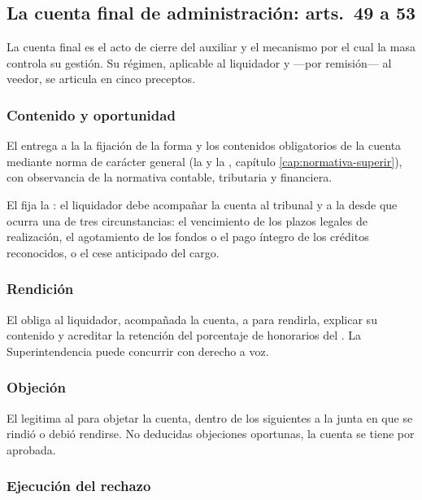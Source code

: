 \subsection{La cuenta final de administración: arts.\ 49 a 53}

La cuenta final es el acto de cierre del auxiliar y el mecanismo por el cual la masa controla su
gestión. Su régimen, aplicable al liquidador y ---por remisión--- al veedor, se articula en
cinco preceptos.

\subsubsection{Contenido y oportunidad}

El  entrega a la \superir{} la fijación de la forma y los contenidos obligatorios de la
cuenta mediante norma de carácter general (la  y la , capítulo
\ref{cap:normativa-superir}), con observancia de la normativa contable, tributaria y financiera.

El  fija la : el liquidador debe acompañar la cuenta al tribunal y
a la \superir{}  desde que ocurra una de tres circunstancias:
el vencimiento de los plazos legales de realización, el agotamiento de los fondos o el pago
íntegro de los créditos reconocidos, o el cese anticipado del cargo.

\subsubsection{Rendición}

El  obliga al liquidador, acompañada la cuenta, a 
para rendirla, explicar su contenido y acreditar la retención del porcentaje de honorarios del
 . La Superintendencia puede concurrir con derecho a voz.

\subsubsection{Objeción}

El  legitima al  para objetar
la cuenta, dentro de los  siguientes a la junta en que se rindió o debió
rendirse. No deducidas objeciones oportunas, la cuenta se tiene por aprobada.

\subsubsection{Ejecución del rechazo}

